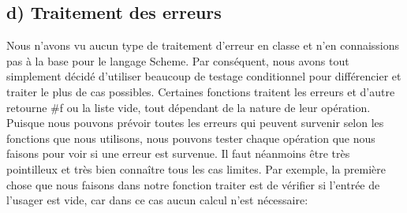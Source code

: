 \documentclass[french]{article}
\begin{document}
		\subsection{d) Traitement des erreurs}
			Nous n'avons vu aucun type de traitement d'erreur en classe et 
			n'en connaissions pas à la base pour le langage Scheme. Par 
			conséquent, nous avons tout simplement décidé d’utiliser beaucoup 
			de testage conditionnel pour différencier et traiter le plus de 
			cas possibles. Certaines fonctions traitent les erreurs et d'autre 
			retourne \#f ou la liste vide, tout dépendant de la nature de leur 
			opération. 
			Puisque nous pouvons prévoir toutes les erreurs qui peuvent 
			survenir selon les fonctions que nous utilisons, nous pouvons 
			tester chaque opération que nous faisons pour voir si une erreur 
			est survenue. Il faut néanmoins être très pointilleux et très bien 
			connaître tous les cas limites. Par exemple, la première chose que 
			nous faisons dans notre fonction traiter est de vérifier si 
			l'entrée de l'usager est vide, car dans ce cas aucun calcul n'est 
			nécessaire: \\
			
			
			
			
		
		
\end{document}

